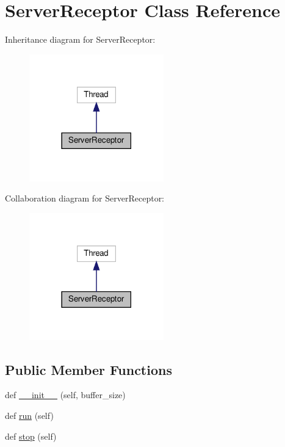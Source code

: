 \hypertarget{class_client_1_1_server_receptor}{}\section{Server\+Receptor Class Reference}
\label{class_client_1_1_server_receptor}


Inheritance diagram for Server\+Receptor\+:
\nopagebreak
\begin{figure}[H]
\begin{center}
\leavevmode
\includegraphics[width=165pt]{class_client_1_1_server_receptor__inherit__graph}
\end{center}
\end{figure}


Collaboration diagram for Server\+Receptor\+:
\nopagebreak
\begin{figure}[H]
\begin{center}
\leavevmode
\includegraphics[width=165pt]{class_client_1_1_server_receptor__coll__graph}
\end{center}
\end{figure}
\subsection*{Public Member Functions}
\begin{DoxyCompactItemize}
\item 
def \hyperlink{class_client_1_1_server_receptor_a8e9700e92cd4deb19f86ea6dc2f98cd3}{\+\_\+\+\_\+init\+\_\+\+\_\+} (self, buffer\+\_\+size)
\item 
def \hyperlink{class_client_1_1_server_receptor_ad22709b2e67308af35f55680d5a026e0}{run} (self)
\item 
def \hyperlink{class_client_1_1_server_receptor_a26ca7c1c7fcdd35378e7be97727047a6}{stop} (self)
\end{DoxyCompactItemize}
